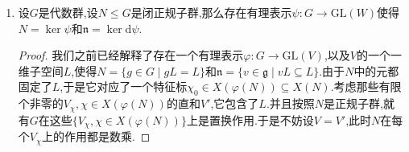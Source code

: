 \begin{enumerate}
\begin{enumerate}[(1)]
    	\item $\mathrm{SL}(n,K)$也没有非平凡特征标.
    	\item 半稳定元.设$\varphi:G\to\mathrm{GL}(V)$是一个有理表示,对$\chi\in X(\varphi(G))$,定义$V_{\chi}=\{x\in V\mid gx=\chi(g)x,\forall g\in G\}$,这是$V$的$G$不变子空间,它的非零元称为关于$\chi$的半稳定元.反过来如果$0\not=x\in V$,使得它所在的直线$L$是$G$不变的,那么定义$\chi(g)v=gv$得到一个$\chi\in X(G)$.另外注意$X(\varphi(G))\to X(G)$是单射,所以$X(\varphi(G))$可以典范的视为$X(G)$的子群.
    	\item 设$\varphi:G\to\mathrm{GL}(V)$是有理表示,那么子空间$\{V_{\chi}\mid\chi\in X(G)\}$是线性无关的.特别的只有有限个$\chi$使得$V_{\chi}$非零.
    	\begin{proof}
    		
    		设$n\ge2$是最小的正整数,使得存在$x_i\in V_{\chi_i},1\le i\le n$,$\chi_i$两两不同,使得$x_1+\cdots+x_n=0$.按照$\chi_i$两两不同,存在某个$g\in G$使得$\chi_1(g)\not=\chi_2(g)$.进而有$0=\varphi(g)\sum x_i=\sum\chi_i(g)x_i$.进而有$\sum\chi_1^{-1}(g)\chi_i(g)x_i=0$.其中$x_1$的系数为1,$x_2$的系数非1,所以把这个式子减去$\sum x_i=0$得到涉及到$\le n-1$个元的求和,这和$n$的最小性相矛盾.
    	\end{proof}
        \item 设$\varphi:G\to\mathrm{GL}(V)$是有理表示,设$N\le G$是正规子群,取$\chi\in X(\varphi(N))$,那么我们断言$\varphi(G)$中的每个元都把$V_{\chi}$映入某个$V_{\chi'},\chi'\in X(\varphi(N))$.由此可定义$G$在$X(\varphi(N))$上的典范作用$g\chi=\chi'$.
        \begin{proof}
        	
        	不妨设$\varphi$是单射,把$G$视为$\mathrm{GL}(V)$的子群.任取$g\in G$,$n\in N$,$x\in V_{\chi}$,那么有:
        	\begin{align*}
        		ngx&=g(g^{-1}ng)x\\&=g\chi(g^{-1}ng)x\\&=\chi(g^{-1}ng)gx
        	\end{align*}
        	于是取$\chi'(n)=\chi(g^{-1}ng)$就满足$g(V_{\chi})\subseteq V_{\chi'}$.
        \end{proof}
    \end{enumerate}
    \item 设$G$是代数群,设$N\le G$是闭正规子群,那么存在有理表示$\psi:G\to\mathrm{GL}(W)$使得$N=\ker\psi$和$\mathfrak{n}=\ker\mathrm{d}\psi$.
    \begin{proof}
    	
    	我们之前已经解释了存在一个有理表示$\varphi:G\to\mathrm{GL}(V)$,以及$V$的一个一维子空间$L$,使得$N=\{g\in G\mid gL=L\}$和$\mathfrak{n}=\{v\in\mathfrak{g}\mid vL\subseteq L\}$.由于$N$中的元都固定了$L$,于是它对应了一个特征标$\chi_0\in X(\varphi(N))\subseteq X(N)$.考虑那些有限个非零的$V_{\chi},\chi\in X(\varphi(N))$的直和$V'$,它包含了$L$.并且按照$N$是正规子群,就有$G$在这些$\{V_{\chi},\chi\in X(\varphi(N))\}$上是置换作用.于是不妨设$V=V'$,此时$N$在每个$V_{\chi}$上的作用都是数乘.
    	

\end{proof}
\end{enumerate}
